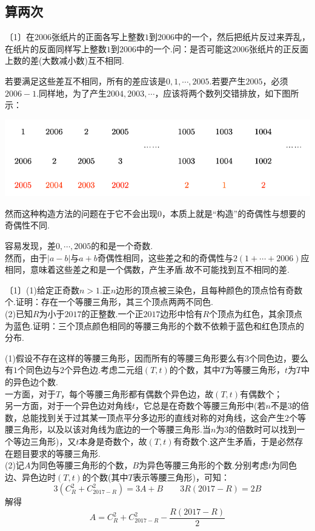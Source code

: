 \documentclass[lang=cn, zihao=4.5]{elegantbook}
\newcommand{\nd}[1]{〔#1〕}
\begin{document}
\subsection{算两次}

\begin{example} %
	\nd{1}在$2006$张纸片的正面各写上整数$1$到$2006$中的一个，然后把纸片反过来弄乱，在纸片的反面同样写上整数$1$到$2006$中的一个.问：是否可能这$2006$张纸片的正反面上数的差(大数减小数)互不相同.
\end{example}
\begin{solution}
	\begin{guess}
		若要满足这些差互不相同，所有的差应该是$0,1, \cdots ,2005$.若要产生$2005$，必须$2006-1$.同样地，为了产生$2004,2003, \cdots$，应该将两个数列交错排放，如下图所示：
		\begin{center}
			\includegraphics{attachment/202302081.pdf}
		\end{center}
		然而这种构造方法的问题在于它不会出现$0$，本质上就是“构造”的奇偶性与想要的奇偶性不同.
	\end{guess}
	容易发现，差$0, \cdots ,2005$的和是一个奇数. \\
	然而，由于$|a-b|$与$a+b$奇偶性相同，这些差之和的奇偶性与$2(1+ \cdots +2006)$应相同，意味着这些差之和是一个偶数，产生矛盾.故不可能找到互不相同的差.
\end{solution}

\begin{example} %
	\nd{1}(1)给定正奇数$n>1$.正$n$边形的顶点被三染色，且每种颜色的顶点恰有奇数个.证明：存在一个等腰三角形，其三个顶点两两不同色. \\
	(2)已知$R$为小于$2017$的正整数.一个正$2017$边形中恰有$R$个顶点为红色，其余顶点为蓝色.证明：三个顶点颜色相同的等腰三角形的个数不依赖于蓝色和红色顶点的分布.
\end{example}
\begin{solution}
	(1)假设不存在这样的等腰三角形，因而所有的等腰三角形要么有$3$个同色边，要么有$1$个同色边与$2$个异色边.考虑二元组$(T,t)$的个数，其中$T$为等腰三角形，$t$为$T$中的异色边个数. \\
	一方面，对于$T$，每个等腰三角形都有偶数个异色边，故$(T,t)$有偶数个； \\
	另一方面，对于一个异色边对角线$t$，它总是在奇数个等腰三角形中(若$n$不是$3$的倍数，总能找到关于过其某一顶点平分多边形的直线对称的对角线，这会产生$2$个等腰三角形，以及以该对角线为底边的一个等腰三角形.当$n$为$3$的倍数时可以找到一个等边三角形)，又$t$本身是奇数个，故$(T,t)$有奇数个.这产生矛盾，于是必然存在题目要求的等腰三角形. \\
	(2)记$A$为同色等腰三角形的个数，$B$为异色等腰三角形的个数.分别考虑$t$为同色边、异色边时$(T,t)$的个数(其中$T$表示等腰三角形)，可知：
	$$3(C_R^2 + C_{2017-R}^2)=3A+B \qquad 3R(2017-R) = 2B$$
	解得$$A=C_R^2 + C_{2017-R}^2 - \dfrac{R(2017-R)}{2}$$
\end{solution}
\end{document}
